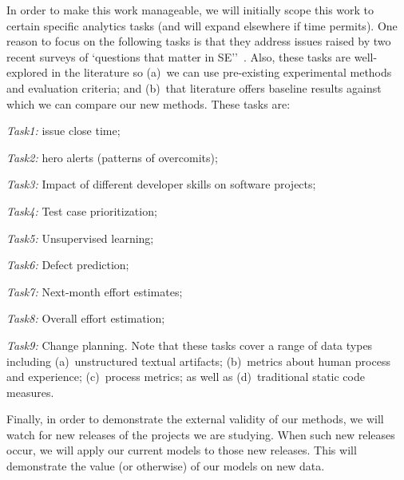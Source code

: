 
In order to make this work manageable,  we will initially
scope this work  to certain specific 
analytics tasks (and will expand elsewhere
if time permits).
One reason to focus on the following tasks is that they address
issues raised by two recent surveys of `questions that matter in SE''~\cite{Begel:2014,gupta2015identifying}.
Also, these tasks are  well-explored in the literature so (a)~we can use pre-existing experimental methods and evaluation criteria; and (b)~that literature offers baseline results against
which we can compare our new methods.
These tasks are:
\bi
\item {\em Task1:} issue close time;
\item  {\em Task2:} hero alerts (patterns of overcomits);
\item {\em Task3:} Impact of different developer skills on software projects;
\item {\em Task4:} Test case prioritization;
\item  {\em Task5:} Unsupervised learning;
\item  {\em Task6:} Defect prediction;
\item  {\em Task7:} Next-month effort estimates;
\item  {\em Task8:} Overall effort estimation;
\item  {\em Task9:} Change planning.
\ei
Note that these tasks cover a range of
data types including
(a)~unstructured textual artifacts;
(b)~metrics about human process and experience;
(c)~process metrics;
as well as (d)~traditional static code measures.

 Finally, in order to demonstrate the external validity of our methods,
we will watch for new releases of the projects we are studying.
When such new releases occur, we will apply our current
models to those new releases. This will demonstrate
the value (or otherwise) of our models on new data.




